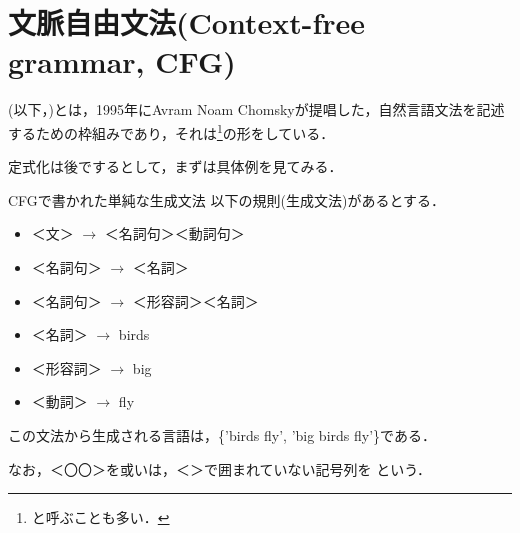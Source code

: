
\section{文脈自由文法(Context-free grammar, CFG)}
(以下，)とは，1995年にAvram Noam
Chomskyが提唱した，自然言語文法を記述するための枠組みであり，それは\footnote{
と呼ぶことも多い．}の形をしている．

定式化は後でするとして，まずは具体例を見てみる．

\begin{myexample}{CFGで書かれた単純な生成文法} 
以下の規則(生成文法)があるとする．
\begin{itemize}
 \item ＜文＞ $\rightarrow$ ＜名詞句＞＜動詞句＞
 \item ＜名詞句＞ $\rightarrow$ ＜名詞＞
 \item ＜名詞句＞ $\rightarrow$ ＜形容詞＞＜名詞＞
 \item ＜名詞＞ $\rightarrow$ birds
 \item ＜形容詞＞ $\rightarrow$ big
 \item ＜動詞＞ $\rightarrow$ fly
\end{itemize}
この文法から生成される言語は，\{'birds fly', 'big birds fly'\}である．

 なお，＜〇〇＞を或いは，＜＞で囲まれていない記号列を
 という． \footnotemark
\end{myexample} 

